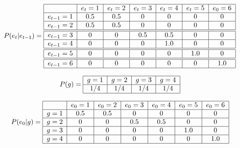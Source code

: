 \documentclass[a4paper,10pt]{article}
\begin{document}
\begin{align}
\centering
P(e_{t}|e_{t-1}) = \begin{tabular}{|c|c|c|c|c|c|c|}
        \hline
        & $e_t=1$ & $e_t=2$ & $e_t=3$ &  $e_t=4$ & $e_t=5$ & $e_0=6$ \\ \hline
       $e_{t-1}=1$ & $0.5$ & $0.5$ & $0$ &  $0$ & $0$ & $0$ \\ \hline
       $e_{t-1}=2$ & $0.5$ & $0.5$ & $0$ & $0$ & $0$ & $0$ \\ \hline \hline
       $e_{t-1}=3$ & $0$ & $0$ & $0.5$ & $0.5$ & $0$ & $0$ \\ \hline
       $e_{t-1}=4$ & $0$ & $0$ & $0$ & $1.0$ & $0$ & $0$ \\ \hline \hline
       $e_{t-1}=5$ & $0$ & $0$ & $0$ & $0$ & $1.0$ & $0$ \\ \hline \hline
       $e_{t-1}=6$ & $0$ & $0$ & $0$ & $0$ & $0$ & $1.0$ \\ \hline
\end{tabular}
\end{align}




\begin{align}
\centering
P(g) = \begin{tabular}{|c|c|c|c|}
        \hline
        $g=1$ & $g=2$ & $g=3$  & $g=4$\\ \hline
        $1/4$ & $1/4$ & $1/4$ & $1/4$ \\ \hline
\end{tabular}
\end{align}

\begin{align}
\centering
P(e_0|g) = \begin{tabular}{|c|c|c|c|c|c|c|}
        \hline
        & $e_0=1$ & $e_0=2$ & $e_0=3$ &  $e_0=4$ & $e_0=5$ & $e_0=6$ \\ \hline
       $g=1$ & $0.5$ & $0.5$ & $0$ &  $0$ & $0$ & $0$ \\ \hline
       $g=2$ & $0$ & $0$ & $0.5$ & $0.5$ & $0$ & $0$ \\ \hline
       $g=3$ & $0$ & $0$ & $0$ & $0$ & $1.0$ & $0$ \\ \hline
       $g=4$ & $0$ & $0$ & $0$ & $0$ & $0$ & $1.0$ \\ \hline
\end{tabular}
\end{align}
\end{document}
